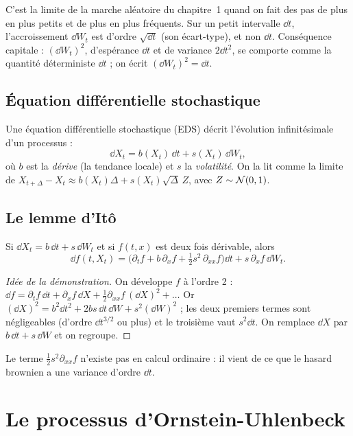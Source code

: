 C'est la limite de la marche aléatoire du chapitre~1 quand on fait des pas de plus en plus petits et de plus en plus fréquents. Sur un petit intervalle $\dd t$, l'accroissement $\dd W_t$ est d'ordre $\sqrt{\dd t}$ (son écart-type), et non $\dd t$. Conséquence capitale : $(\dd W_t)^2$, d'espérance $\dd t$ et de variance $2\dd t^2$, se comporte comme la quantité déterministe $\dd t$ ; on écrit $(\dd W_t)^2 = \dd t$.

\subsection{Équation différentielle stochastique}

Une équation différentielle stochastique (EDS) décrit l'évolution infinitésimale d'un processus :
\[
\dd X_t = b(X_t)\,\dd t + s(X_t)\,\dd W_t,
\]
où $b$ est la \emph{dérive} (la tendance locale) et $s$ la \emph{volatilité}. On la lit comme la limite de $X_{t+\Delta} - X_t \approx b(X_t)\Delta + s(X_t)\sqrt\Delta\,Z$, avec $Z\sim\mathcal{N}(0,1)$.

\subsection{Le lemme d'Itô}

\begin{proposition}
Si $\dd X_t = b\,\dd t + s\,\dd W_t$ et si $f(t,x)$ est deux fois dérivable, alors
\[
\dd f(t, X_t) = \Big(\partial_t f + b\,\partial_x f + \tfrac12 s^2\,\partial_{xx}f\Big)\dd t + s\,\partial_x f\,\dd W_t.
\]
\end{proposition}
\begin{proof}[Idée de la démonstration]
On développe $f$ à l'ordre 2 : $\dd f = \partial_t f\,\dd t + \partial_x f\,\dd X + \frac12\partial_{xx}f\,(\dd X)^2 + \dots$ Or $(\dd X)^2 = b^2\dd t^2 + 2bs\,\dd t\,\dd W + s^2(\dd W)^2$ ; les deux premiers termes sont négligeables (d'ordre $\dd t^{3/2}$ ou plus) et le troisième vaut $s^2\dd t$. On remplace $\dd X$ par $b\,\dd t + s\,\dd W$ et on regroupe.
\end{proof}

Le terme $\frac12 s^2\partial_{xx}f$ n'existe pas en calcul ordinaire : il vient de ce que le hasard brownien a une variance d'ordre $\dd t$.

\section{Le processus d'Ornstein-Uhlenbeck}

